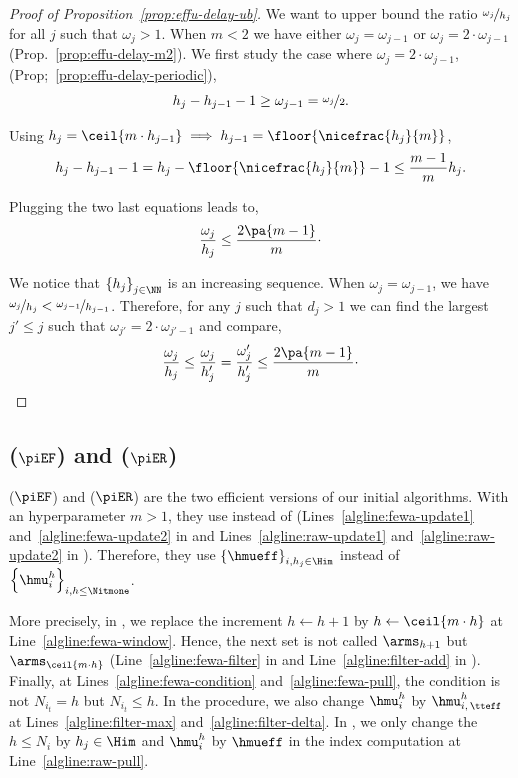 \begin{proof}[Proof of Proposition~\ref{prop:effu-delay-ub}]
We want to upper bound the ratio $\nicefrac{\omega_j}{h_j}$ for all $j$ such that $\omega_j>1$.  When $m < 2$ we have either $\omega_{j} = \omega_{j-1} $ or $\omega_{j} = 2 \cdot \omega_{j-1}$ (Prop.~\ref{prop:effu-delay-m2}). We first study the case where $\omega_{j} = 2 \cdot \omega_{j-1}$, \ie (Prop;~\ref{prop:effu-delay-periodic}),
\[
h_j - h_{j-1} - 1 \geq \omega_{j-1} = \nicefrac{\omega_{j}}{2}.
\]

Using $h_j = \ceil{m\cdot h_{j-1}}\implies h_{j-1} = \floor{\nicefrac{h_j}{m}}$, 
\[
h_j - h_{j-1} - 1 = h_j - \floor{\nicefrac{h_j}{m}} - 1  \leq \frac{m-1}{m} h_j.
\]

Plugging the two last equations leads to, 
\[
\frac{\omega_j}{h_j} \leq \frac{2 \pa{m-1}}{m}\cdot
\]


We notice that $\left\{h_j\right\}_{j \in \NN}$ is an increasing sequence. When $\omega_{j} = \omega_{j-1}$,  we have $\nicefrac{\omega_{j}}{h_j} < \nicefrac{\omega_{j-1}}{h_{j-1}}$. Therefore, for any $j$ such that $d_j > 1$ we can find the largest $j'\leq j$ such that $\omega_{j'} = 2 \cdot \omega_{j'-1}$ and compare, 
\[
\frac{\omega_j}{h_j} \leq \frac{\omega_j}{h_j'} = \frac{\omega_j'}{h_j'} \leq \frac{2 \pa{m-1}}{m}\cdot
\]
\end{proof}

\subsection{{\EFFFEWA} ($\piEF$) and {\EFFRAW} ($\piER$)}
{\EFFFEWA} ($\piEF$) and {\EFFRAW} ($\piER$) are the two efficient versions of our initial algorithms. With an hyperparameter $m>1$, they use \EFF instead of \UPDATE (Lines~\ref{algline:fewa-update1} and~\ref{algline:fewa-update2} in \FEWA and Lines~\ref{algline:raw-update1} and~\ref{algline:raw-update2} in \RUCB). Therefore, they use $\left\{\hmueff\right\}_{i,h_j\in \Him}$ instead of $\left\{\hmu_i^h\right\}_{i,h \leq \Nitmone}$. 

More precisely, in \FEWA, we replace the increment $h\gets h+1$ by $h\gets\ceil{m\cdot h}$ at Line~\ref{algline:fewa-window}. Hence, the next set is not called $\arms_{h+1}$ but $\arms_{\ceil{m\cdot h}}$ (Line~\ref{algline:fewa-filter} in \FEWA and Line~\ref{algline:filter-add} in \FILTER). Finally, at Lines~\ref{algline:fewa-condition} and~\ref{algline:fewa-pull}, the condition is not $N_{i_t}=h$ but $N_{i_t} \leq h$. In the \FILTER procedure, we also change $\hmu_i^h$ by $\hmu_{i,\,\tteff}^h$ at Lines~\ref{algline:filter-max} and~\ref{algline:filter-delta}. In \RUCB, we only change the $h\leq N_i$ by $h_j \in \Him$ and $\hmu_i^h$ by $\hmueff$ in the index computation at Line~\ref{algline:raw-pull}.

